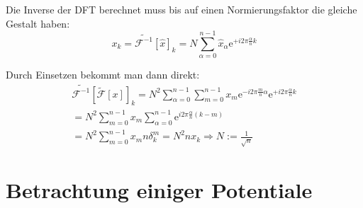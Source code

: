\documentclass[10pt,a4paper,german]{scrartcl}
\begin{document}
		Die Inverse der DFT berechnet muss bis auf einen Normierungsfaktor die gleiche
		Gestalt haben:
		\begin{equation}
		\label{eq:idft}
			x_k
			= \tilde{\mathcal{F}^{-1}}[\hat{x}]_k
			= N \sum_{\alpha=0}^{n-1} \hat{x}_\alpha \mathrm{e}^{+ i 2\pi \frac{\alpha}{n} k}
		\end{equation}

		Durch Einsetzen bekommt man dann direkt:
		\begin{multline*}
			\tilde{\mathcal{F}^{-1}}[\tilde{\mathcal{F}}[x]]_k
			= N^2 \sum_{\alpha=0}^{n-1}
				\sum_{m=0}^{n-1} x_m \mathrm{e}^{- i 2\pi \frac{m}{n} \alpha}
		 	\mathrm{e}^{+ i 2\pi \frac{\alpha}{n} k} \\
		 	= N^2 \sum_{m=0}^{n-1} x_m
		 	  \sum_{\alpha=0}^{n-1}	\mathrm{e}^{i 2\pi \frac{\alpha}{n}(k-m)}\\
		 	= N^2 \sum_{m=0}^{n-1} x_m
		 	  n \delta^m_k
		 	= N^2 n x_k \Rightarrow N := \frac{1}{\sqrt{n}}
		\end{multline*}

  \section{Betrachtung einiger Potentiale}
\end{document}
